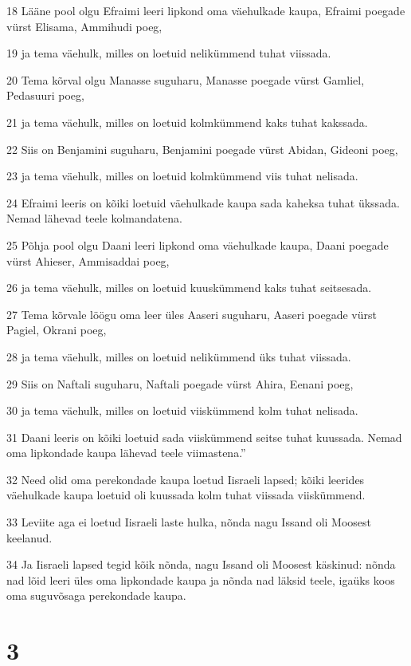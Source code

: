 \par 18 Lääne pool olgu Efraimi leeri lipkond oma väehulkade kaupa, Efraimi poegade vürst Elisama, Ammihudi poeg,
\par 19 ja tema väehulk, milles on loetuid nelikümmend tuhat viissada.
\par 20 Tema kõrval olgu Manasse suguharu, Manasse poegade vürst Gamliel, Pedasuuri poeg,
\par 21 ja tema väehulk, milles on loetuid kolmkümmend kaks tuhat kakssada.
\par 22 Siis on Benjamini suguharu, Benjamini poegade vürst Abidan, Gideoni poeg,
\par 23 ja tema väehulk, milles on loetuid kolmkümmend viis tuhat nelisada.
\par 24 Efraimi leeris on kõiki loetuid väehulkade kaupa sada kaheksa tuhat ükssada. Nemad lähevad teele kolmandatena.
\par 25 Põhja pool olgu Daani leeri lipkond oma väehulkade kaupa, Daani poegade vürst Ahieser, Ammisaddai poeg,
\par 26 ja tema väehulk, milles on loetuid kuuskümmend kaks tuhat seitsesada.
\par 27 Tema kõrvale löögu oma leer üles Aaseri suguharu, Aaseri poegade vürst Pagiel, Okrani poeg,
\par 28 ja tema väehulk, milles on loetuid nelikümmend üks tuhat viissada.
\par 29 Siis on Naftali suguharu, Naftali poegade vürst Ahira, Eenani poeg,
\par 30 ja tema väehulk, milles on loetuid viiskümmend kolm tuhat nelisada.
\par 31 Daani leeris on kõiki loetuid sada viiskümmend seitse tuhat kuussada. Nemad oma lipkondade kaupa lähevad teele viimastena.”
\par 32 Need olid oma perekondade kaupa loetud Iisraeli lapsed; kõiki leerides väehulkade kaupa loetuid oli kuussada kolm tuhat viissada viiskümmend.
\par 33 Leviite aga ei loetud Iisraeli laste hulka, nõnda nagu Issand oli Moosest keelanud.
\par 34 Ja Iisraeli lapsed tegid kõik nõnda, nagu Issand oli Moosest käskinud: nõnda nad lõid leeri üles oma lipkondade kaupa ja nõnda nad läksid teele, igaüks koos oma suguvõsaga perekondade kaupa.

\chapter{3}

